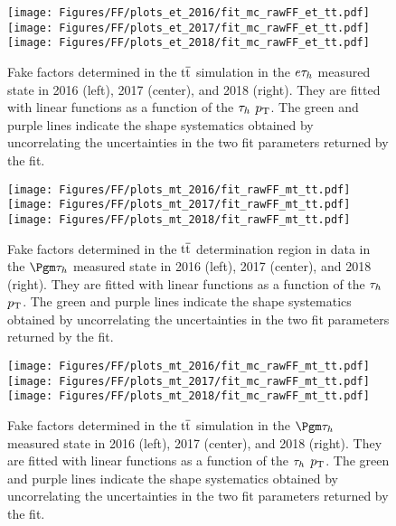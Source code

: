 \begin{figure}[ht!b]
\centering
\texttt{[image: Figures/FF/plots\_et\_2016/fit\_mc\_rawFF\_et\_tt.pdf]}
\texttt{[image: Figures/FF/plots\_et\_2017/fit\_mc\_rawFF\_et\_tt.pdf]}
\texttt{[image: Figures/FF/plots\_et\_2018/fit\_mc\_rawFF\_et\_tt.pdf]}\\
\caption{\label{fig:fit_raw_et_ttmc} Fake factors determined in the $\mathrm{t}\overline{\mathrm{t}}$ simulation in the $e\tau_h$ measured state in 2016 (left), 2017 (center), and 2018 (right). They are fitted with linear functions as a function of the $\tau_h$ $p_{\mathrm{T}}$. The green and purple lines indicate the shape systematics obtained by uncorrelating the uncertainties in the two fit parameters returned by the fit.  }
\end{figure}

\begin{figure}[ht!b]
\centering
\texttt{[image: Figures/FF/plots\_mt\_2016/fit\_rawFF\_mt\_tt.pdf]}
\texttt{[image: Figures/FF/plots\_mt\_2017/fit\_rawFF\_mt\_tt.pdf]}
\texttt{[image: Figures/FF/plots\_mt\_2018/fit\_rawFF\_mt\_tt.pdf]}\\
\caption{\label{fig:fit_raw_mt_tt} Fake factors determined in the $\mathrm{t}\overline{\mathrm{t}}$ determination region in data in the $\Pgm\tauh$ measured state in 2016 (left), 2017 (center), and 2018 (right). They are fitted with linear functions as a function of the $\tau_h$ $p_{\mathrm{T}}$. The green and purple lines indicate the shape systematics obtained by uncorrelating the uncertainties in the two fit parameters returned by the fit.  }
\end{figure}


\begin{figure}[ht!b]
\centering
\texttt{[image: Figures/FF/plots\_mt\_2016/fit\_mc\_rawFF\_mt\_tt.pdf]}
\texttt{[image: Figures/FF/plots\_mt\_2017/fit\_mc\_rawFF\_mt\_tt.pdf]}
\texttt{[image: Figures/FF/plots\_mt\_2018/fit\_mc\_rawFF\_mt\_tt.pdf]}\\
\caption{\label{fig:fit_raw_mt_ttmc} Fake factors determined in the $\mathrm{t}\overline{\mathrm{t}}$ simulation in the $\Pgm\tauh$ measured state in 2016 (left), 2017 (center), and 2018 (right). They are fitted with linear functions as a function of the $\tau_h$ $p_{\mathrm{T}}$. The green and purple lines indicate the shape systematics obtained by uncorrelating the uncertainties in the two fit parameters returned by the fit.  }
\end{figure}
\clearpage
